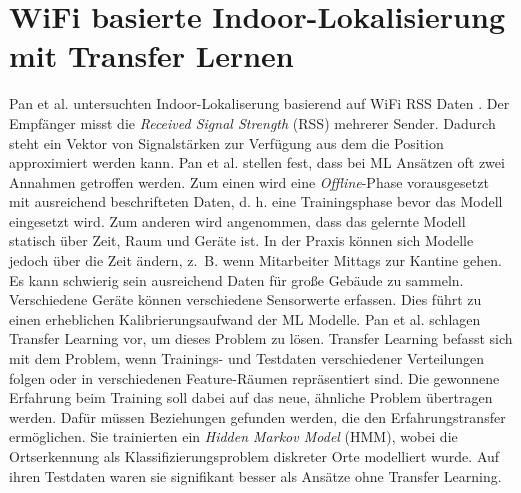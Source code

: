 \newpage
\section{WiFi basierte Indoor-Lokalisierung mit Transfer Lernen}
Pan et al. untersuchten Indoor-Lokaliserung basierend auf WiFi RSS Daten \cite{pan2008transfer}.
Der Empfänger misst die \textit{Received Signal Strength} (RSS) mehrerer Sender.
Dadurch steht ein Vektor von Signalstärken zur Verfügung aus dem die Position approximiert werden kann.
\newline
\newline
Pan et al. stellen fest, dass bei ML Ansätzen oft zwei Annahmen getroffen werden.
Zum einen wird eine \textit{Offline}-Phase vorausgesetzt mit ausreichend beschrifteten Daten,
d. h. eine Trainingsphase bevor das Modell eingesetzt wird.
Zum anderen wird angenommen, dass das gelernte Modell statisch über Zeit, Raum und Geräte ist.
\newline
\newline
In der Praxis können sich Modelle jedoch über die Zeit ändern, z.~B. wenn Mitarbeiter Mittags zur Kantine gehen.
Es kann schwierig sein ausreichend Daten für große Gebäude zu sammeln.
Verschiedene Geräte können verschiedene Sensorwerte erfassen.
Dies führt zu einen erheblichen Kalibrierungsaufwand der ML Modelle.
\newline
\newline
Pan et al. schlagen Transfer Learning vor, um dieses Problem zu lösen.
Transfer Learning befasst sich mit dem Problem, wenn Trainings- und Testdaten verschiedener Verteilungen folgen oder in verschiedenen Feature-Räumen repräsentiert sind.
Die gewonnene Erfahrung beim Training soll dabei auf das neue, ähnliche Problem übertragen werden.
Dafür müssen Beziehungen gefunden werden, die den Erfahrungstransfer ermöglichen.
\newline
\newline
Sie trainierten ein \textit{Hidden Markov Model} (HMM), wobei die Ortserkennung als Klassifizierungsproblem diskreter Orte modelliert wurde.
Auf ihren Testdaten waren sie signifikant besser als Ansätze ohne Transfer Learning.
